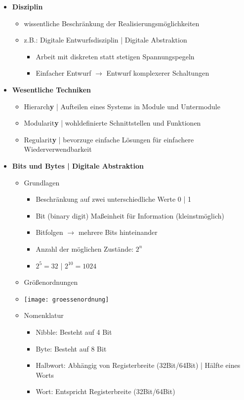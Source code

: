\begin{itemize}
\vspace{0.4cm}

\item \textbf{Disziplin}
	\begin{itemize}
	\item wissentliche Beschränkung der Realisierungsmöglichkeiten
	\item z.B.: Digitale Entwurfsdisziplin | Digitale Abstraktion 
		\begin{itemize}
		\item Arbeit mit diskreten statt stetigen Spannungspegeln
		\item Einfacher Entwurf $\rightarrow$ Entwurf komplexerer Schaltungen
		\end{itemize}
	\end{itemize}

\item \textbf{Wesentliche Techniken}
	\begin{itemize}
	\item Hierarch\textbf{y} | Aufteilen eines Systems in Module und Untermodule
	\item Modularit\textbf{y} | wohldefinierte Schnittstellen und Funktionen
	\item Regularit\textbf{y} | bevorzuge einfache Lösungen für einfachere Wiederverwendbarkeit
	\end{itemize} 

\item \textbf{Bits und Bytes | Digitale Abstraktion}
	\begin{itemize}
	\item Grundlagen 
		\begin{itemize}
		\item Beschränkung auf zwei unterschiedliche Werte 0 | 1
		\item Bit (binary digit) Maßeinheit für Information (kleinstmöglich)
		\item Bitfolgen $\rightarrow$ mehrere Bits hinteinander
		\item Anzahl der möglichen Zustände: $2^n$
		\item $2^5 = 32$ | $2^{10} = 1024$
		\end{itemize}		 
	
	\item Größenordnungen
	\item[] %
				\texttt{[image: groessenordnung]}
		
	\item Nomenklatur
		\begin{itemize}
		\item Nibble: Besteht auf 4 Bit
		\item Byte: Besteht auf 8 Bit
		\item Halbwort: Abhängig von Registerbreite (32Bit/64Bit) | Hälfte eines Worts
		\item Wort: Entspricht Registerbreite (32Bit/64Bit)
		\end{itemize}
	\end{itemize}
	
	
\end{itemize}

